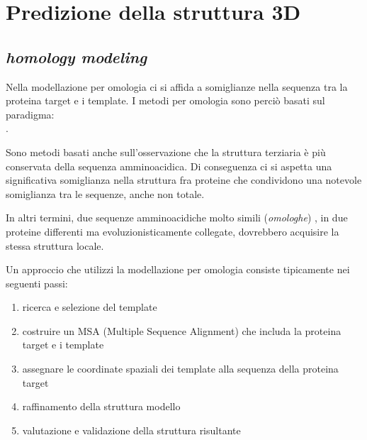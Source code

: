 \section{Predizione della struttura 3D}

\subsection{\textit{homology modeling}}
{
	Nella modellazione per omologia ci si affida a somiglianze nella sequenza tra la proteina target e i template. I metodi per omologia sono perciò basati sul paradigma: \\
	.
	
	\par Sono metodi basati anche sull'osservazione che la struttura terziaria è più conservata della sequenza amminoacidica. Di conseguenza ci si aspetta una significativa somiglianza nella struttura fra proteine che condividono una notevole somiglianza tra le sequenze, anche non totale.
	
	\par In altri termini, due sequenze amminoacidiche molto simili (\textit{omologhe}) , in due proteine differenti ma evoluzionisticamente collegate, dovrebbero acquisire la stessa struttura locale.
	
	\par Un approccio che utilizzi la modellazione per omologia consiste tipicamente nei seguenti passi:
	\begin{enumerate}
		\item ricerca e selezione del template
		\item costruire un MSA (Multiple Sequence Alignment) che includa la proteina target e i template
		\item assegnare le coordinate spaziali dei template alla sequenza della proteina target
		\item raffinamento della struttura modello
		\item valutazione e validazione della struttura risultante
	\end{enumerate}
	
}
